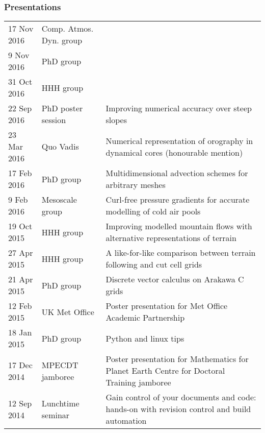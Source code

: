 \documentclass[a4paper,11pt]{article}
\begin{document}
\subsubsection*{Presentations}
\begin{tabularx}{\linewidth}{l l X}
17 Nov 2016 & Comp. Atmos. Dyn. group & \\
9 Nov 2016 & PhD group & \\
31 Oct 2016 & HHH group & \\
22 Sep 2016 & PhD poster session & Improving numerical accuracy over steep slopes \\
23 Mar 2016 & Quo Vadis & Numerical representation of orography in dynamical cores (honourable mention) \\
17 Feb 2016 & PhD group & Multidimensional advection schemes for arbitrary meshes \\
9 Feb 2016 & Mesoscale group & Curl-free pressure gradients for accurate modelling of cold air pools \\
19 Oct 2015 & HHH group & Improving modelled mountain flows with alternative representations of terrain \\
27 Apr 2015 & HHH group & A like-for-like comparison between terrain following and cut cell grids \\
21 Apr 2015 & PhD group & Discrete vector calculus on Arakawa C grids \\
12 Feb 2015 & UK Met Office & Poster presentation for Met Office Academic Partnership \\
18 Jan 2015 & PhD group & Python and linux tips \\
17 Dec 2014 & MPECDT jamboree & Poster presentation for Mathematics for Planet Earth Centre for Doctoral Training jamboree \\
12 Sep 2014 & Lunchtime seminar  & Gain control of your documents and code: hands-on with revision control and build automation \\
\end{tabularx}
\end{document}
